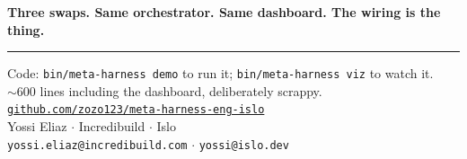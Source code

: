 \documentclass[11pt]{article}
\begin{document}
\textbf{Three swaps. Same orchestrator. Same dashboard. The wiring is the thing.}

\vspace{0.5em}
{\color{border}\hrule}
\vspace{0.6em}

\begin{center}
\small\color{dim}
Code: \texttt{bin/meta-harness demo} to run it; \texttt{bin/meta-harness viz} to watch it.\\
$\sim$600 lines including the dashboard, deliberately scrappy.\\[0.6em]
\href{https://github.com/zozo123/meta-harness-eng-islo}{\texttt{github.com/zozo123/meta-harness-eng-islo}}\\[0.2em]
Yossi Eliaz $\cdot$ Incredibuild $\cdot$ Islo\\[0.1em]
\texttt{yossi.eliaz@incredibuild.com} $\cdot$ \texttt{yossi@islo.dev}
\end{center}
\end{document}
